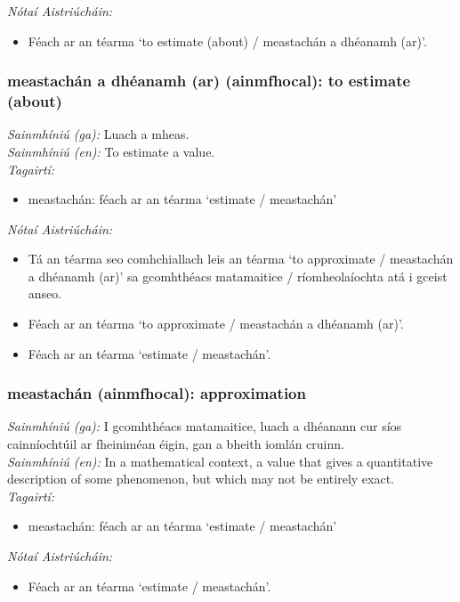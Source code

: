  \noindent \textit{Nótaí Aistriúcháin:}
\begin{itemize}
	\item Féach ar an téarma `to estimate (about) / meastachán a dhéanamh (ar)'.
\end{itemize}


\subsubsection*{meastachán a dhéanamh (ar) (ainmfhocal): to estimate (about)}
 \noindent \textit{Sainmhíniú (ga):} Luach a mheas.
\\
 \noindent \textit{Sainmhíniú (en):} To estimate a value.
\\
 \noindent \textit{Tagairtí:}
\begin{itemize}
	\item meastachán: féach ar an téarma `estimate / meastachán'
\end{itemize}

 \noindent \textit{Nótaí Aistriúcháin:}
\begin{itemize}
	\item Tá an téarma seo comhchiallach leis an téarma `to approximate / meastachán a dhéanamh (ar)' sa gcomhthéacs matamaitice / ríomheolaíochta atá i gceist anseo.
	\item Féach ar an téarma `to approximate / meastachán a dhéanamh (ar)'.
	\item Féach ar an téarma `estimate / meastachán'.
\end{itemize}


\subsubsection*{meastachán (ainmfhocal): approximation}
 \noindent \textit{Sainmhíniú (ga):} I gcomhthéacs matamaitice, luach a dhéanann cur síos cainníochtúil ar fheiniméan éigin, gan a bheith iomlán cruinn.
\\
 \noindent \textit{Sainmhíniú (en):} In a mathematical context, a value that gives a quantitative description of some phenomenon, but which may not be entirely exact.
\\
 \noindent \textit{Tagairtí:}
\begin{itemize}
	\item meastachán: féach ar an téarma `estimate / meastachán'
\end{itemize}

 \noindent \textit{Nótaí Aistriúcháin:}
\begin{itemize}
	\item Féach ar an téarma `estimate / meastachán'.
\end{itemize}


